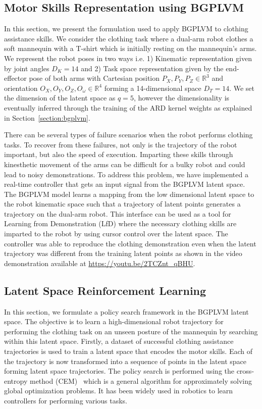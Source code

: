 \documentclass{article}
\begin{document}
\subsection{Motor Skills Representation using BGPLVM}
\label{section:clothassist}

In this section, we present the formulation used to apply BGPLVM to clothing assistance skills. We consider the clothing task where a dual-arm robot clothes a soft mannequin with a T-shirt which is initially resting on the mannequin's arms. We represent the robot poses in two ways i.e. 1) Kinematic representation given by joint angles $D_K = 14$ and 2) Task space representation given by the end-effector pose of both arms with Cartesian position ${P_X,P_Y,P_Z} \in \mathbb{R}^3$ and orientation ${O_X,O_Y,O_Z,O_{\omega}} \in \mathbb{R}^4$ forming a 14-dimensional space $D_T = 14$. We set the dimension of the latent space as $q = 5$, however the dimensionality is eventually inferred through the training of the ARD kernel weights as explained in Section~\ref{section:bgplvm}.

There can be several types of failure scenarios when the robot performs clothing tasks. To recover from these failures, not only is the trajectory of the robot important, but also the speed of execution. Imparting these skills through kinesthetic movement of the arms can be difficult for a bulky robot and could lead to noisy demonstrations. To address this problem, we have implemented a real-time controller that gets an input signal from the BGPLVM latent space. The BGPLVM model learns a mapping from the low dimensional latent space to the robot kinematic space such that a trajectory of latent points generates a trajectory on the dual-arm robot. This interface can be used as a tool for Learning from Demonstration (LfD) where the necessary clothing skills are imparted to the robot by using cursor control over the latent space. The controller was able to reproduce the clothing demonstration even when the latent trajectory was different from the training latent points as shown in the video demonstration available at \url{https://youtu.be/2TCZnt_qBHU}.

\subsection{Latent Space Reinforcement Learning}
\label{section:latentrl}

In this section, we formulate a policy search framework in the BGPLVM latent space. The objective is to learn a high-dimensional robot trajectory for performing the clothing task on an unseen posture of the mannequin by searching within this latent space. Firstly, a dataset of successful clothing assistance trajectories is used to train a latent space that encodes the motor skills. Each of the trajectory is now transformed into a sequence of points in the latent space forming latent space trajectories. The policy search is performed using the cross-entropy method (CEM)~\cite{cem} which is a general algorithm for approximately solving global optimization problems. It has been widely used in robotics to learn controllers for performing various tasks.
\end{document}
